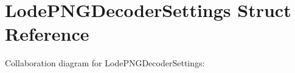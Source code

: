 \section{Lode\+P\+N\+G\+Decoder\+Settings Struct Reference}
\label{struct_lode_p_n_g_decoder_settings}


Collaboration diagram for Lode\+P\+N\+G\+Decoder\+Settings\+:
